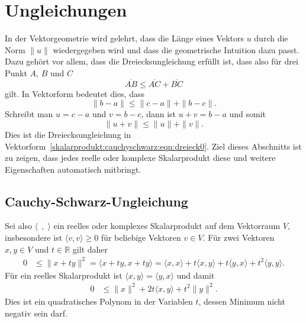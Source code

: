%
%
%
\section{Ungleichungen
\label{buch:skalarprodukte:section:cauchyschwarz}}
In der Vektorgeometrie wird gelehrt, dass die Länge eines Vektors $u$
durch die Norm $\|u\|$ wiedergegeben wird und dass die geometrische
Intuition dazu passt.
Dazu gehört vor allem, dass die Dreiecksungleichung erfüllt ist,
dass also für drei Punkt $A$, $B$ und $C$
\begin{equation}
\overline{AB} \le \overline{AC} + \overline{BC}
\label{skalarprodukt:ungleichungen:eqn:dreieck}
\end{equation}
gilt.
In Vektorform bedeutet dies, dass
\[
\| b-a\|
\le
\| c-a\| + \|b-c\|.
\]
Schreibt man $u=c-a$ und $v=b-c$, dann ist $u+v=b-a$ und somit
\begin{equation}
\| u+v\| \le \|u\| + \|v\|.
\label{skalarprodukt:cauchyschwarz:eqn:dreieck0}
\end{equation}
Dies ist die Dreiecksungleichung in
Vektorform~\eqref{skalarprodukt:cauchyschwarz:eqn:dreieck0}.
Ziel dieses Abschnitts ist zu zeigen, dass jedes reelle oder
komplexe Skalarprodukt diese und weitere Eigenschaften automatisch
mitbringt.

%
%
\subsection{Cauchy-Schwarz-Ungleichung}
Sei also $\langle\;\,,\;\rangle$ ein reelles oder komplexes Skalarprodukt
auf dem Vektorraum $V$,
insbesondere ist $\langle v,v\rangle\ge 0$ für beliebige Vektoren $v\in V$.
Für zwei Vektoren $x,y\in V$ und $t\in \mathbb{R}$  gilt daher
\begin{align}
0
&\le
\| x+ty\|^2
=
\langle x+ty,x+ty\rangle
=
\langle x,x\rangle
+
t\langle x,y\rangle
+
t\langle y,x\rangle
+
t^2
\langle y,y\rangle.
\label{skalarprodukt:cauchyschwarz:eqn:quadrat}
\end{align}
Für ein reelles Skalarprodukt ist $\langle x,y\rangle=\langle y,x\rangle$
und damit
\begin{align}
0
&\le
\|x\|^2 + 2t\langle x,y\rangle + t^2 \|y\|^2.
\label{buch:skalarprodukt:cauchyschwarz:eqn:cspoly}
\end{align}
Dies ist ein quadratisches Polynom in der Variablen $t$, dessen Minimum
nicht negativ sein darf.

